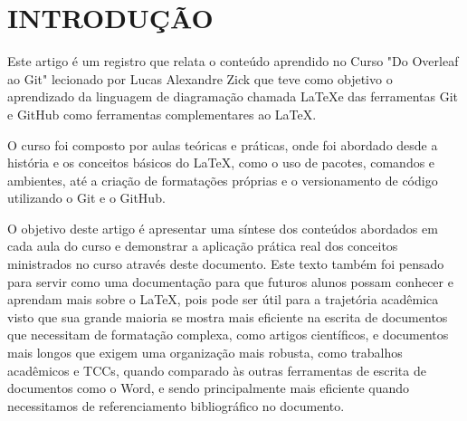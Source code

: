 \chapter*{INTRODUÇÃO}
Este artigo é um registro que relata o conteúdo aprendido no Curso "Do Overleaf ao Git" lecionado por Lucas Alexandre Zick que teve como objetivo o aprendizado da linguagem de diagramação chamada \LaTeX e das ferramentas Git e GitHub como ferramentas complementares ao \LaTeX.

O curso foi composto por aulas teóricas e práticas, onde foi abordado desde a história e os conceitos básicos do \LaTeX, como o uso de pacotes, comandos e ambientes, até a criação de formatações próprias e o versionamento de código utilizando o Git e o GitHub.

O objetivo deste artigo é apresentar uma síntese dos conteúdos abordados em cada aula do curso e demonstrar a aplicação prática real dos conceitos ministrados no curso através deste documento. Este texto também foi pensado para servir como uma documentação para que futuros alunos possam conhecer e aprendam mais sobre o \LaTeX, pois pode ser útil para a trajetória acadêmica visto que sua grande maioria se mostra mais eficiente na escrita de documentos que necessitam de formatação complexa, como artigos científicos, e documentos mais longos que exigem uma organização mais robusta, como trabalhos acadêmicos e TCCs, quando comparado às outras ferramentas de escrita de documentos como o Word, e sendo principalmente mais eficiente quando necessitamos de referenciamento bibliográfico no documento.